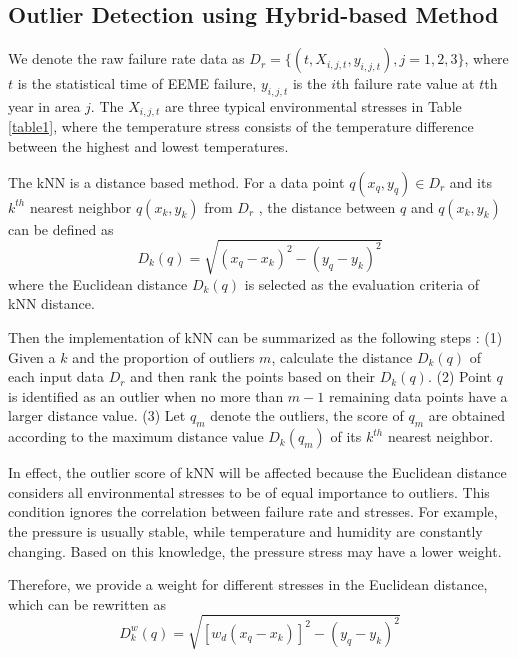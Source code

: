 \documentclass[journal,twoside,web]{ieeecolor}
\begin{document}
\subsection{Outlier Detection using Hybrid-based Method}
We denote the raw failure rate data as $ D_{r}=\{(t,  X_{i,j,t}, y_{i,j,t}  ), j = 1,2,3\} $, where $ t $ is the statistical time of EEME failure, $ y_{i,j,t} $ is the $ i $th failure rate value at $ t $th year in area $ j $. The $ X_{i,j,t} $ are three typical environmental stresses in Table \ref{table1}, where the temperature stress consists of the temperature difference between the highest and lowest temperatures.

The kNN is a distance based method. For a data point $ q(x_{q}, y_{q}) \in D_{r} $ and its $ k^{th} $ nearest neighbor $ q(x_{k}, y_{k}) $ from $ D_{r} $ , the distance between $ q $ and $ q(x_{k}, y_{k}) $ can be defined as
\begin{equation}\label{eq12Euclidean}
D_{k}(q) = \sqrt{(x_{q} - x_{k})^{2} - (y_{q} - y_{k})^{2}}
\end{equation}
where the Euclidean distance $ D_{k}(q) $ is selected as the evaluation criteria of kNN distance.

Then the implementation of kNN can be summarized as the following steps \cite{Ramaswamy}: (1) Given a $ k $ and the proportion of outliers $ m $, calculate the distance $ D_{k}(q) $ of each input data $ D_{r} $ and then rank the points based on their $ D_{k}(q) $. 
(2) Point $ q $ is identified as an outlier when no more than $ m-1 $ remaining data points have a larger distance value. (3) Let $ q_{m} $ denote the outliers, the score of $ q_{m} $ are obtained according to the maximum distance value $ D_{k}(q_{m}) $ of its $ k^{th} $ nearest neighbor.

In effect, the outlier score of kNN will be affected because the Euclidean distance considers all environmental stresses to be of equal importance to outliers. This condition ignores the correlation between failure rate and stresses.
For example, the pressure is usually stable, while temperature and humidity are constantly changing. Based on this knowledge, the pressure stress may have a lower weight.

Therefore, we provide a weight for different stresses in the Euclidean distance, which can be rewritten as
\begin{equation}\label{eq13Euclidean}
D_{k}^{w}(q) = \sqrt{[w_{d}(x_{q} - x_{k})]^{2} - (y_{q} - y_{k})^{2}}
\end{equation}
\end{document}
